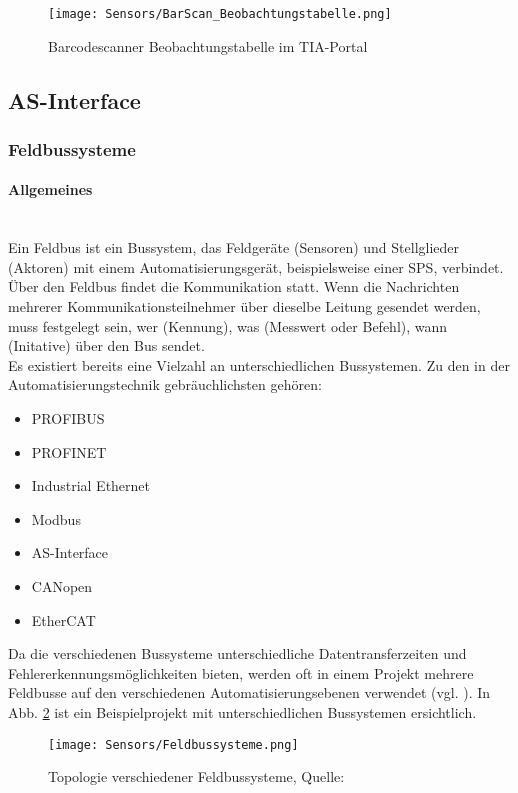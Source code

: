 \begin{figure}[H]
    \centering
    \texttt{[image: Sensors/BarScan\_Beobachtungstabelle.png]}
    \caption{Barcodescanner Beobachtungstabelle im TIA-Portal}
    \label{BarScan_BTabelle}
\end{figure}

\subsection{AS-Interface}
\subsubsection{Feldbussysteme} \label{sec:Feldbussysteme}
\paragraph{Allgemeines}\mbox{}\\
Ein Feldbus ist ein Bussystem, das Feldgeräte (Sensoren) und Stellglieder (Aktoren) mit einem Automatisierungsgerät, beispielsweise einer SPS, verbindet. Über den Feldbus findet die Kommunikation statt. Wenn die Nachrichten mehrerer Kommunikationsteilnehmer über dieselbe Leitung gesendet werden, muss festgelegt sein, wer (Kennung), was (Messwert oder Befehl), wann (Initative) über den Bus sendet.\\
Es existiert bereits eine Vielzahl an unterschiedlichen Bussystemen. Zu den in der Automatisierungstechnik gebräuchlichsten gehören:
\begin{itemize}
    \item PROFIBUS
    \item PROFINET
    \item Industrial Ethernet
    \item Modbus
    \item AS-Interface
    \item CANopen
    \item EtherCAT
\end{itemize}
Da die verschiedenen Bussysteme unterschiedliche Datentransferzeiten und Fehlererkennungsmöglichkeiten bieten, werden oft in einem Projekt mehrere Feldbusse auf den verschiedenen Automatisierungsebenen verwendet (vgl. \cite{Feldbussysteme}). In Abb. \ref{Feldbussysteme} ist ein Beispielprojekt mit unterschiedlichen Bussystemen ersichtlich.\\

\begin{figure}[H]
    \centering
    \texttt{[image: Sensors/Feldbussysteme.png]}
    \caption{Topologie verschiedener Feldbussysteme, Quelle: \cite{Topologie_Bussysteme}}
    \label{Feldbussysteme}
\end{figure}

